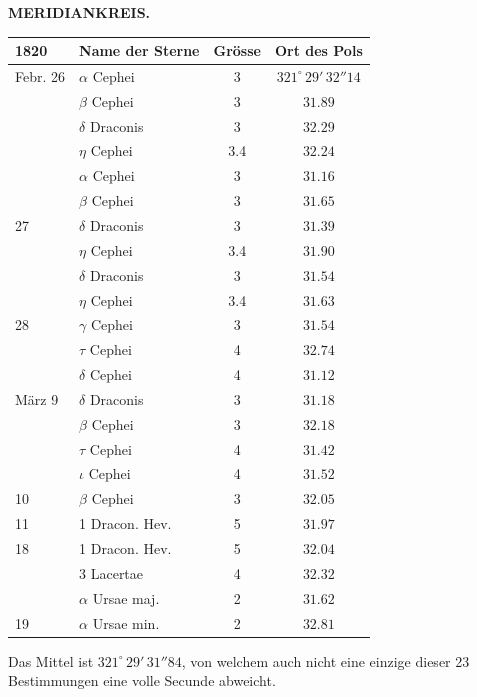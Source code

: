 \clearpage
\noindent{}%
\makebox[12mm][l]{}%
\parbox[t]{\dimexpr\linewidth-24mm\relax}{\centering\footnotesize\bfseries MERIDIANKREIS.\par}%
\par\nobreak\medskip
\begin{center}
\begin{tabular}{l|l|c|c}
1820 & Name der Sterne & Grösse & Ort des Pols \\
\hline
Febr. 26 & $\alpha$ Cephei & 3 & $321^\circ\,29'\,32''14$ \\
 & $\beta$ Cephei & 3 & $31.89$ \\
 & $\delta$ Draconis & 3 & $32.29$ \\
 & $\eta$ Cephei & 3.4 & $32.24$ \\
 & $\alpha$ Cephei & 3 & $31.16$ \\
 & $\beta$ Cephei & 3 & $31.65$ \\
27 & $\delta$ Draconis & 3 & $31.39$ \\
 & $\eta$ Cephei & 3.4 & $31.90$ \\
 & $\delta$ Draconis & 3 & $31.54$ \\
 & $\eta$ Cephei & 3.4 & $31.63$ \\
28 & $\gamma$ Cephei & 3 & $31.54$ \\
 & $\tau$ Cephei & 4 & $32.74$ \\
 & $\delta$ Cephei & 4 & $31.12$ \\
März 9 & $\delta$ Draconis & 3 & $31.18$ \\
 & $\beta$ Cephei & 3 & $32.18$ \\
 & $\tau$ Cephei & 4 & $31.42$ \\
 & $\iota$ Cephei & 4 & $31.52$ \\
10 & $\beta$ Cephei & 3 & $32.05$ \\
11 & 1 Dracon. Hev. & 5 & $31.97$ \\
18 & 1 Dracon. Hev. & 5 & $32.04$ \\
 & 3 Lacertae & 4 & $32.32$ \\
 & $\alpha$ Ursae maj. & 2 & $31.62$ \\
19 & $\alpha$ Ursae min. & 2 & $32.81$ \\
\end{tabular}
\end{center}

\par\indent Das Mittel ist $321^\circ\,29'\,31''84$, von welchem auch nicht eine einzige dieser 23
Bestimmungen eine volle Secunde abweicht.

